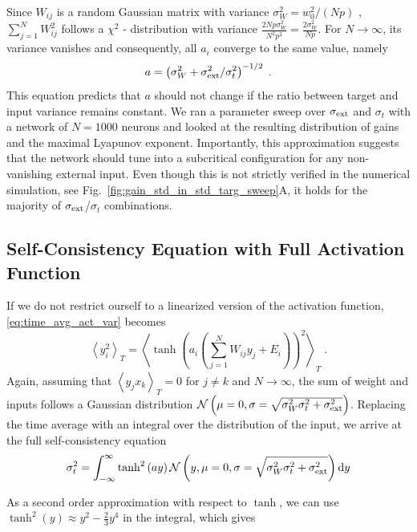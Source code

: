 \documentclass[10pt,a4paper]{article}
\newcommand{\avgt}[1]{\left< #1 \right>_T}
\begin{document}
Since $W_{ij}$ is a random Gaussian matrix with variance $\sigma_W^2 = w_0^2/\left( N p \right)$ , $\sum_{j=1}^{N} W_{ij}^2$ follows a $\chi^2$ - distribution with variance $\frac{2N p \sigma_{W}^2}{N^2 p^2} = \frac{2 \sigma_{W}^2}{N p}$. For $N \rightarrow \infty $, its variance vanishes and consequently, all $a_i$ converge to the same value, namely 
\begin{equation}
	a = \left(\sigma_{W}^2 + \sigma_{\rm ext}^2 / \sigma_{t}^2\right)^{-1/2} \; . \label{eq:gain_pred}
\end{equation}
This equation predicts that $a$ should not change if the ratio between target and input variance remains constant. We ran a parameter sweep over $\sigma_{\rm ext}$ and $\sigma_{t}$ with a network of $N = 1000$ neurons and looked at the resulting distribution of gains and the maximal Lyapunov exponent. Importantly, this approximation suggests that the network should tune into a subcritical configuration for any non-vanishing external input. Even though this is not strictly verified in the numerical simulation, see Fig.~\ref{fig:gain_std_in_std_targ_sweep}A, it holds for the majority of $ \sigma_{\rm ext}$/$\sigma_{t}$ combinations.

\subsection{Self-Consistency Equation with Full Activation Function}
If we do not restrict ourself to a linearized version of the activation function, \eqref{eq:time_avg_act_var} becomes
\begin{equation}
	\avgt{y_i^2} = \avgt{\tanh\left(a_i\left(\sum_{j=1}^{N} W_{ij} y_j + E_i\right)\right)^2} \; .
\end{equation}
Again, assuming that $\avgt{y_j x_k}=0$ for $j\neq k$ and $N \rightarrow \infty$, the sum of weight and inputs follows a Gaussian distribution $\mathcal{N}\left(\mu = 0, \sigma = \sqrt{\sigma^2_{W}\sigma^2_{t} + \sigma^2_{\rm ext}}\right)$. Replacing the time average with an integral over the distribution of the input, we arrive at the full self-consistency equation
\begin{equation}
	\sigma^2_{t} = \int_{-\infty}^{\infty}  \tanh^2\left(ay\right) \mathcal{N}\left(y, \mu = 0, \sigma = \sqrt{\sigma^2_{W}\sigma^2_{t} + \sigma^2_{\rm ext}}\right)	\mathrm{d}y \label{eq:self-consistency_var_full}
\end{equation}

As a second order approximation with respect to $\tanh$, we can use $\tanh^2(y) \approx y^2 - \frac{2}{3} y^4$ in the integral, which gives
\end{document}
